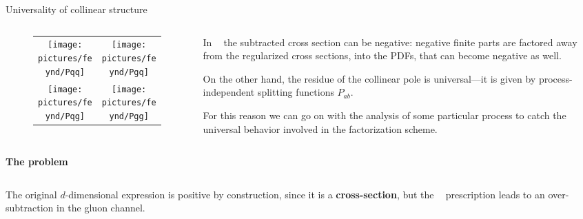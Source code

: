 \documentclass[8pt]{beamer}
\DeclareMathOperator{\msbar}{\overline{MS}}
\begin{document}
\begin{frame}{Universality of collinear structure}
    \vspace*{15pt}
    \begin{columns}
        \begin{column}{0.45\textwidth}
            \begin{figure} \begin{tabular}{cc}
                \texttt{[image: pictures/feynd/Pqq]} &
                \texttt{[image: pictures/feynd/Pgq]} \\
                \texttt{[image: pictures/feynd/Pqg]} &
                \texttt{[image: pictures/feynd/Pgg]} \\
            \end{tabular}
            \end{figure}

        \end{column}
        \begin{column}{0.55\textwidth}
            In $\msbar$ the subtracted cross section can be negative: negative
            finite parts are factored away from the regularized cross sections,
            into the PDFs, that can become negative as well.
            \newline

            On the other hand, the residue of the collinear pole is
            universal—it is given by process-independent splitting functions
            $P_{ab}$.
            \newline

            For this reason we can go on with the analysis of some particular
            process to catch the universal behavior involved in the
            factorization scheme.
        \end{column}
    \end{columns}

    \vspace*{15pt}
    \textbf{\large The problem}

    \begin{columns}
        \begin{column}{0.4\textwidth}
            The original $d$-dimensional expression is positive by construction, since
            it is a \textbf{cross-section}, but the $\msbar$ prescription leads to an
            over-subtraction in the gluon channel.


\end{column}
\end{columns}
\end{frame}
\end{document}
